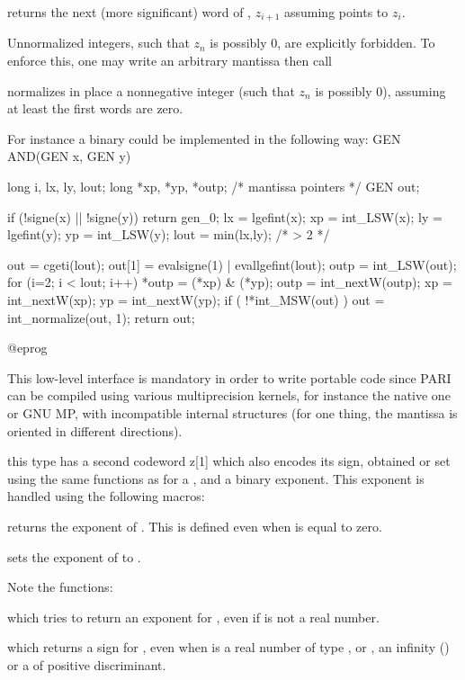  returns the next (more significant) word of ,
$z_{i+1}$ assuming  points to $z_i$.

Unnormalized integers, such that $z_n$ is possibly $0$, are explicitly
forbidden. To enforce this, one may write an arbitrary mantissa then call


\noindent normalizes in place a nonnegative integer (such that $z_n$ is
possibly $0$), assuming at least the first  words are zero.

\noindent For instance a binary  could be implemented in the
following way:
\bprog
GEN AND(GEN x, GEN y) {
  long i, lx, ly, lout;
  long *xp, *yp, *outp; /* mantissa pointers */
  GEN out;

  if (!signe(x) || !signe(y)) return gen_0;
  lx = lgefint(x); xp = int_LSW(x);
  ly = lgefint(y); yp = int_LSW(y); lout = min(lx,ly); /* > 2 */

  out = cgeti(lout); out[1] = evalsigne(1) | evallgefint(lout);
  outp = int_LSW(out);
  for (i=2; i < lout; i++)
  {
    *outp = (*xp) & (*yp);
    outp  = int_nextW(outp);
    xp    = int_nextW(xp);
    yp    = int_nextW(yp);
  }
  if ( !*int_MSW(out) ) out = int_normalize(out, 1);
  return out;
}
@eprog

\noindent This low-level interface is mandatory in order to write portable
code since PARI can be compiled using various multiprecision kernels, for
instance the native one or GNU MP, with incompatible internal structures
(for one thing, the mantissa is oriented in different directions).

this type has a second codeword z[1] which
also encodes its sign, obtained or set using the same functions as for a
, and a binary exponent. This exponent is handled using the
following macros:

 returns the exponent of .
This is defined even when  is equal to zero.

 sets the exponent of  to .

\noindent Note the functions:

 which tries to return an exponent for ,
even if  is not a real number.

 which returns a sign for , even when
 is a real number of type ,  or ,
an infinity () or a  of positive discriminant.

